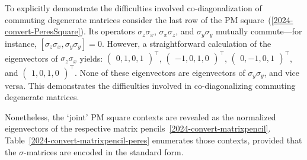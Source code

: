 \documentclass[
  twocolumn,
 showpacs,
 showkeys,
 preprintnumbers,
 amsmath,amssymb,
 aps,
 pra,
  longbibliography,
 floatfix,
 ]{revtex4-2}
\newcommand\myotimes{ }
\begin{document}
To explicitly demonstrate the difficulties involved co-diagonalization of commuting degenerate matrices
consider the last row of  the PM square~(\ref{2024-convert-PeresSquare}).
Its operators
$\sigma_z  \myotimes   \sigma_x$, $\sigma_x  \myotimes   \sigma_z$, and $\sigma_y  \myotimes   \sigma_y $ mutually
commute---for instance, $[\sigma_z  \myotimes   \sigma_x,\sigma_y  \myotimes   \sigma_y]=0$.
However, a straightforward calculation of the eigenvectors of $\sigma_z \myotimes  \sigma_x$ yields:
$\begin{pmatrix}
{0, 1, 0, 1}
\end{pmatrix}^\intercal $,
$\begin{pmatrix}
{-1, 0, 1, 0}
\end{pmatrix}^\intercal $,
$\begin{pmatrix}
{0, -1, 0, 1}
\end{pmatrix}^\intercal $, and
$\begin{pmatrix}
{1, 0, 1, 0}
\end{pmatrix}^\intercal $.
None of these eigenvectors are eigenvectors of $\sigma_y \myotimes  \sigma_y$, and vice versa.
This demonstrates the difficulties involved in co-diagonalizing  commuting degenerate matrices.

Nonetheless, the `joint' PM square contexts are revealed as the normalized eigenvectors of the respective matrix pencils~\eqref{2024-convert-matrixpencil}.
Table~\ref{2024-convert-matrixpencil-peres} enumerates those contexts,
provided that the $\sigma$-matrices are encoded in the standard form.
\end{document}
